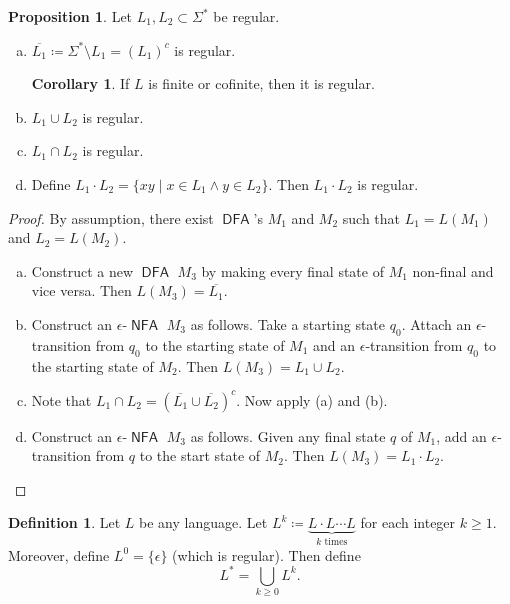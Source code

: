 \documentclass[10pt,letterpaper,cm]{nupset}
\theoremstyle{definition}
\newtheorem*{definition}{Definition}
\newtheorem{prop}{Proposition}
\newtheorem{corollary}{Corollary}
\newcommand{\1}{\mathbf{1}}
\newcommand{\0}{\vec 0}
\DeclareMathOperator{\DFA}{\mathsf{DFA}}
\DeclareMathOperator{\NFA}{\mathsf{NFA}}
\begin{document}
\begin{prop} Let $L_1, L_2\subset \Sigma^{\ast}$ be regular. 
\begin{enumerate}[(a)]
\item $\overline{L_1}\coloneqq \Sigma^{\ast} \setminus L_1 = (L_1)^c$ is regular.
\begin{corollary}
If $L$ is finite or cofinite, then it is regular.
\end{corollary}
\item $L_1 \cup L_2$ is regular.
\item $L_1 \cap L_2$ is regular. 
\item Define $L_1\cdot L_2 = \{xy \mid x\in L_1 \land y\in L_2\}$. Then $L_1 \cdot L_2$ is regular. 
\end{enumerate}
\end{prop} 
\begin{proof} By assumption, there exist $\DFA$'s $M_1$ and $M_2$ such that $L_1 = L(M_1)$ and $L_2 = L(M_2)$.
\begin{enumerate}[(a)]
\item Construct a new $\DFA$ $M_3$ by making every final state of $M_1$ non-final and vice versa. Then $L(M_3) = \overline{L_1}$.
\item Construct an $\epsilon$-$\NFA$ $M_3$ as follows. Take a starting state $q_0$. Attach  an $\epsilon$-transition  from $q_0$ to the starting state of $M_1$  and  an $\epsilon$-transition from $q_0$ to the starting state of $M_2$. Then $L(M_3) = L_1 \cup L_2$.
\item Note that $L_1 \cap L_2 = (\overline{L_1} \cup \overline{L_2})^c$.  Now apply (a) and (b).
\item Construct an $\epsilon$-$\NFA$ $M_3$ as follows. Given any final state $q$ of $M_1$, add an $\epsilon$-transition from $q$ to the start state of $M_2$. Then $L(M_3) = L_1\cdot L_2$.
\end{enumerate}
\end{proof}

\begin{definition}
Let $L$ be any language. Let $L^k \coloneqq \underbrace{L\cdot L \cdots L}_{k \text{ times}}$ for each integer $k\geq 1$. Moreover, define $L^0 = \{\epsilon\}$ (which is regular). Then define $$L^{\ast} = \bigcup_{k\geq 0} L^k.$$
\end{definition}
\end{document}
